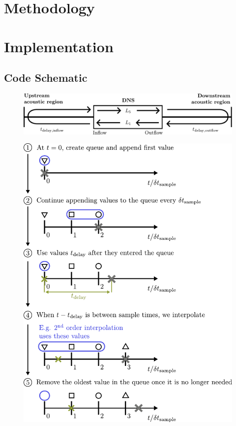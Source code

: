 \section{Methodology}

\section{Implementation}


\subsection{Code Schematic}

\begin{figure}[h]
\centering
\includegraphics[scale=0.6]{assets/imgs/delay_bc_model.pdf}
\label{fig:delay-model}
\caption{}
\end{figure}

\begin{figure}[h]
\centering
\includegraphics[scale=0.6]{assets/imgs/delay_bc_queue.pdf}
\label{fig:delay-queue}
\caption{}
\end{figure}

